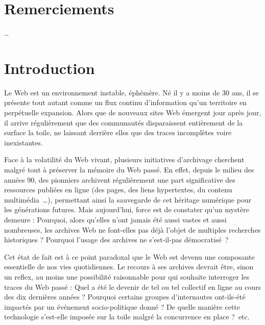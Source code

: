 \documentclass[symmetric,justified,marginals=raggedouter]{tufte-book}
\begin{document}

\newpage
\chapter*{Remerciements}
\noindent \ldots{}


\tableofcontents




\mainmatter

\chapter*{Introduction}

\noindent Le Web est un environnement instable, éphémère. Né il y a moins de 30 ans, il se présente tout autant comme un flux continu d'information qu'un territoire en perpétuelle expansion. Alors que de nouveaux sites Web émergent jour après jour, il arrive régulièrement que des communautés disparaissent entièrement de la surface la toile, ne laissant derrière elles que des traces incomplètes voire inexistantes.

Face à la volatilité du Web vivant, plusieurs initiatives d'archivage cherchent malgré tout à préserver la mémoire du Web passé. En effet, depuis le milieu des années 90, des pionniers archivent régulièrement une part significative des ressources publiées en ligne (des pages, des liens hypertextes, du contenu multimédia~\ldots{}), permettant ainsi la sauvegarde de cet héritage numérique pour les générations futures. Mais aujourd'hui, force est de constater qu'un mystère demeure : Pourquoi, alors qu'elles n'ont jamais été aussi vastes et aussi nombreuses, les archives Web ne font-elles pas déjà l'objet de multiples recherches historiques ? Pourquoi l'usage des archives ne s'est-il-pas démocratisé~?

Cet état de fait est à ce point paradoxal que le Web est devenu une composante essentielle de nos vies quotidiennes. Le recours à ses archives devrait être, sinon un reflex, au moins une possibilité raisonnable pour qui souhaite interroger les traces du Web passé : Quel a été le devenir de tel ou tel collectif en ligne au cours des dix dernières années ? Pourquoi certains groupes d'internautes ont-ils-été impactés par un événement socio-politique donné ? De quelle manière cette technologie s'est-elle imposée sur la toile malgré la concurrence en place ?~etc. 
\end{document}
